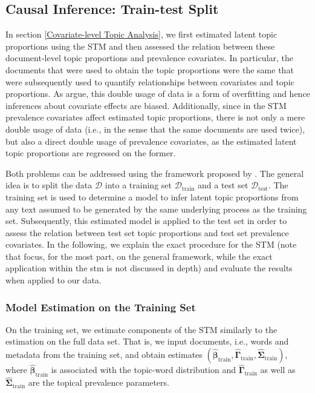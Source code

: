 \subsection{Causal Inference: Train-test Split}
\label{Causal Inference: Train-test Split}

In section \ref{Covariate-level Topic Analysis}, we first estimated latent topic proportions using the STM and then assessed the relation between these document-level topic proportions and prevalence covariates. In particular, the documents that were used to obtain the topic proportions were the same that were subsequently used to quantify relationships between covariates and topic proportions. As \cite{egami2018make} argue, this double usage of data is a form of overfitting and hence inferences about covariate effects are biased. Additionally, since in the STM prevalence covariates affect estimated topic proportions, there is not only a mere double usage of data (i.e., in the sense that the same documents are used twice), but also a direct double usage of prevalence covariates, as the estimated latent topic proportions are regressed on the former.

Both problems can be addressed using the framework proposed by \cite{egami2018make}. The general idea is to split the data $\mathcal{D}$ into a training set $\mathcal{D}_{\text{train}}$ and a test set $\mathcal{D}_{\text{test}}$. The training set is used to determine a model to infer latent topic proportions from any text assumed to be generated by the same underlying process as the training set. Subsequently, this estimated model is applied to the test set in order to assess the relation between test set topic proportions and test set prevalence covariates. In the following, we explain the exact procedure for the STM (note that \cite{egami2018make} focus, for the most part, on the general framework, while the exact application within the stm is not discussed in depth) and evaluate the results when applied to our data. 

\subsubsection{Model Estimation on the Training Set}
\label{Model Estimation on the Training Set}

On the training set, we estimate components of the STM similarly to the estimation on the full data set. That is, we input documents, i.e., words and metadata from the training set, and obtain estimates $(\hat{\boldsymbol{\beta}}_{\text{train}}, \hat{\boldsymbol{\Gamma}}_{\text{train}}, \hat{\boldsymbol{\Sigma}}_{\text{train}})$, where $\hat{\boldsymbol{\beta}}_{\text{train}}$ is associated with the topic-word distribution and $\hat{\boldsymbol{\Gamma}}_{\text{train}}$ as well as $\hat{\boldsymbol{\Sigma}}_{\text{train}}$ are the topical prevalence parameters. 

